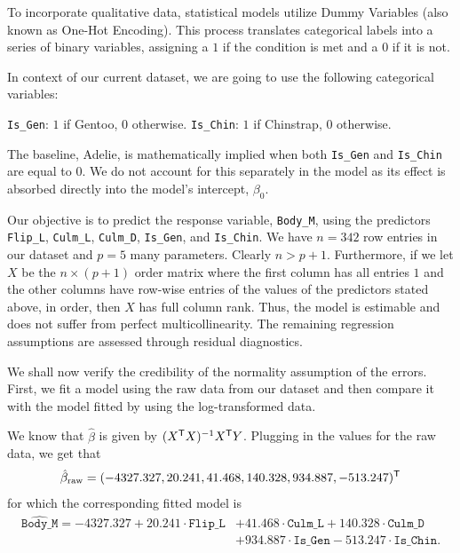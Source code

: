 \documentclass[12pt]{article}
\begin{document}
  To incorporate qualitative data, statistical models
  utilize Dummy Variables (also known as One-Hot Encoding).
  This process translates categorical labels into a series of
  binary variables, assigning a $1$ if the condition is met
  and a $0$ if it is not.

  In context of our current dataset, we are going to
  use the following categorical variables:
  \begin{itemize}
      \ii \texttt{Is\_Gen}: $1$ if Gentoo, $0$ otherwise.
      \ii \texttt{Is\_Chin}: $1$ if Chinstrap, $0$ otherwise.
  \end{itemize}
  The baseline, Adelie, is mathematically implied when both
  \texttt{Is\_Gen} and \texttt{Is\_Chin} are equal to $0$.
  We do not account for this separately in the model as
  its effect is absorbed directly
  into the model's intercept, $\beta_0$.

  Our objective is to predict the response variable,
  \texttt{Body\_M}, using the predictors \texttt{Flip\_L},
  \texttt{Culm\_L}, \texttt{Culm\_D}, \texttt{Is\_Gen}, and
  \texttt{Is\_Chin}. We have $n=342$ row entries in our dataset and
  $p=5$ many parameters.
  Clearly $n > p+1$. Furthermore,
  if we let $X$ be the $n \times (p+1)$ order matrix
  where the first column has all entries $1$ and the other columns
  have row-wise entries of the values of the predictors
  stated above, in order, then $X$ has full column rank.
  Thus, the model is estimable and does not suffer from
  perfect multicollinearity.
  The remaining regression assumptions are assessed
  through residual diagnostics.

  We shall now verify the credibility of the normality assumption
  of the errors. First, we fit a model using the raw data from our
  dataset and then compare it with the model fitted by using
  the log-transformed data.

  We know that $\hat{\beta}$ is given by $(X^{\mathsf{T}} X)^{-1} X^{\mathsf{T}} Y$.
  Plugging in the values for the raw data, we get that
  \[
    \hat{\beta}_{\text{raw}}
    = (-4327.327, 20.241, 41.468, 140.328, 934.887, -513.247)^{\mathsf{T}}
  \]
  for which the corresponding fitted model is
  \begin{align*}
    \widehat{\texttt{Body\_M}} = -4327.327
    + 20.241\cdot\texttt{Flip\_L}
    &+ 41.468\cdot\texttt{Culm\_L}
    + 140.328\cdot\texttt{Culm\_D} \\
    &+ 934.887\cdot\texttt{Is\_Gen}
    -513.247\cdot\texttt{Is\_Chin}
  .\end{align*}
\end{document}
